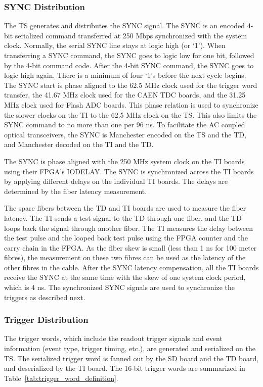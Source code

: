\subsubsection{SYNC Distribution}

The TS generates and distributes the SYNC signal.  The SYNC is an encoded 4-bit serialized command transferred at 250 Mbps synchronized with the system clock.  Normally, the serial SYNC line stays at logic high (or ‘1’).  When transferring a SYNC command, the SYNC goes to logic low for one bit, followed by the 4-bit command code.  After the 4-bit SYNC command, the SYNC goes to logic high again.  There is a minimum of four ‘1’s before the next cycle begins.  The SYNC start is phase aligned to the 62.5 MHz clock used for the trigger word transfer, the 41.67 MHz clock used for the CAEN TDC boards, and the 31.25 MHz clock used for Flash ADC boards.  This phase relation is used to synchronize the slower clocks on the TI to the 62.5 MHz clock on the TS.  This also limits the SYNC command to no more than one per 96 ns.  To facilitate the AC coupled optical transceivers, the SYNC is Manchester encoded on the TS and the TD, and Manchester decoded on the TI and the TD.

The SYNC is phase aligned with the 250 MHz system clock on the TI boards using their FPGA’s IODELAY.  The SYNC is synchronized across the TI boards by applying different delays on the individual TI boards.  The delays are determined by the fiber latency measurement.  

The spare fibers between the TD and TI boards are used to measure the fiber latency.  The TI sends a test signal to the TD through one fiber, and the TD loops back the signal through another fiber.  The TI measures the delay between the test pulse and the looped back test pulse using the FPGA counter and the carry chain in the FPGA.  As the fiber skew is small (less than 1 ns for 100 meter fibres), the measurement on these two fibres can be used as the latency of the other fibres in the cable.  
After the SYNC latency compensation, all the TI boards receive the SYNC at the same time with the skew of one system clock period, which is 4 ns.  The synchronized SYNC signals are used to synchronize the triggers as described next.


\subsubsection{Trigger Distribution}

The trigger words, which include the readout trigger signals and event information (event type, trigger timing, etc.), are generated and serialized on the TS.  The serialized trigger word is fanned out by the SD board and the TD board, and deserialized by the TI board.  The 16-bit trigger words are summarized in Table~\ref{tab:trigger_word_definition}.  

